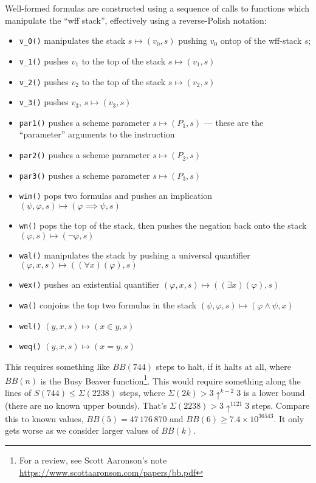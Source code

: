\begin{node}
\begin{node}
\begin{node}
Well-formed formulas are constructed using a sequence of calls to
functions which manipulate the ``wff stack'', effectively using a
reverse-Polish notation:
\begin{itemize}
\item \verb|v_0()| manipulates the stack $s\mapsto (v_{0},s)$ pushing
  $v_{0}$ ontop of the wff-stack $s$;
\item \verb|v_1()| pushes $v_{1}$ to the top of the stack $s\mapsto(v_{1},s)$
\item \verb|v_2()| pushes $v_{2}$ to the top of the stack $s\mapsto(v_{2},s)$
\item \verb|v_3()| pushes $v_{3}$, $s\mapsto(v_{3},s)$
\item \verb|par1()| pushes a scheme parameter $s\mapsto(P_{1},s)$ ---
  these are the ``parameter'' arguments to the instruction
\item \verb|par2()| pushes a scheme parameter $s\mapsto(P_{2},s)$
\item \verb|par3()| pushes a scheme parameter $s\mapsto(P_{3},s)$
\item \verb|wim()| pops two formulas and pushes an implication $(\psi,\varphi,s)\mapsto(\varphi\implies\psi,s)$
\item \verb|wn()| pops the top of the stack, then pushes the negation
  back onto the stack $(\varphi,s)\mapsto(\neg\varphi,s)$
\item \verb|wal()| manipulates the stack by pushing a universal quantifier $(\varphi,x,s)\mapsto((\forall x)(\varphi),s)$
\item \verb|wex()| pushes an existential quantifier $(\varphi,x,s)\mapsto((\exists x)(\varphi),s)$
\item \verb|wa()| conjoins the top two formulas in the stack
  $(\psi,\varphi,s)\mapsto(\varphi\land\psi,x)$
\item \verb|wel()| $(y,x,s)\mapsto(x\in y,s)$
\item \verb|weq()| $(y,x,s)\mapsto(x=y,s)$
\end{itemize}
\end{node}

\begin{node}\label{set:zfc-000H}%
This requires something like $BB(744)$ steps to halt, if
it halts at all, where $BB(n)$ is the Busy Beaver function\footnote{For
a review, see Scott Aaronson's note \url{https://www.scottaaronson.com/papers/bb.pdf}}.
This would require something along the lines of
$S(744)\leq\Sigma(2238)$ steps, where $\Sigma(2k)>3\uparrow^{k-2}3$ is a
lower bound (there are no known upper bounds). That's
$\Sigma(2238)>3\uparrow^{1121}3$ steps. Compare this to known values, $BB(5)=47\,176\,870$
and $BB(6)\geq 7.4\times 10^{36543}$. It only gets worse as we consider
larger values of $BB(k)$. 


\end{node}
\end{node}
\end{node}
